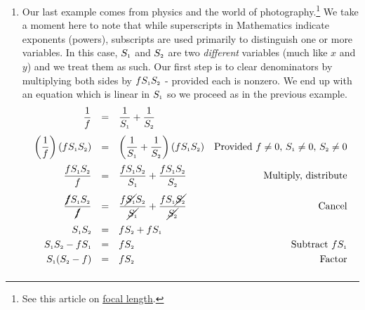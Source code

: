 \documentclass{ximera}
\begin{document}
\begin{example}
\begin{enumerate}
\item  Our last example comes from physics and the world of photography.\footnote{See this article on \href{https://en.wikipedia.org/wiki/Focal_length}{\underline{focal length}}.}  We take a moment here to note that while superscripts in Mathematics indicate exponents (powers), subscripts are used primarily to distinguish one or more variables.  In this case, $S_{\text{\tiny $1$}}$ and $S_{\text{\tiny $2$}}$ are two \textit{different} variables (much like $x$ and $y$) and we treat them as such. Our first step is to clear denominators by multiplying both sides by $f S_{\text{\tiny $1$}} S_{\text{\tiny $2$}}$ - provided each is nonzero.  We end up with an equation which is linear in $S_{\text{\tiny $1$}}$ so we proceed as in the previous example.  \[ \begin{array}{rclr}

\dfrac{1}{f} & = & \dfrac{1}{S_{\text{\tiny $1$}}} + \dfrac{1}{S_{\text{\tiny $2$}}} & \\ [12pt]


\left(\dfrac{1}{f}\right)(fS_{\text{\tiny $1$}}S_{\text{\tiny $2$}}) & = & \left(\dfrac{1}{S_{\text{\tiny $1$}}} + \dfrac{1}{S_{\text{\tiny $2$}}}\right) (fS_{\text{\tiny $1$}}S_{\text{\tiny $2$}}) & \text{Provided $f \neq 0$, $S_{\text{\tiny $1$}} \neq 0$, $S_{\text{\tiny $2$}}\neq 0$} \\ [12pt]

\dfrac{fS_{\text{\tiny $1$}}S_{\text{\tiny $2$}}}{f} & = & \dfrac{fS_{\text{\tiny $1$}}S_{\text{\tiny $2$}}}{S_{\text{\tiny $1$}}} + \dfrac{fS_{\text{\tiny $1$}}S_{\text{\tiny $2$}}}{S_{\text{\tiny $2$}}} & \text{Multiply, distribute} \\ [12pt]


\dfrac{\cancel{f}S_{\text{\tiny $1$}}S_{\text{\tiny $2$}}}{\cancel{f}} & = & \dfrac{f\cancel{S_{\text{\tiny $1$}}}S_{\text{\tiny $2$}}}{\cancel{S_{\text{\tiny $1$}}}} + \dfrac{fS_{\text{\tiny $1$}}\cancel{S_{\text{\tiny $2$}}}}{\cancel{S_{\text{\tiny $2$}}}} & \text{Cancel} \\ [12pt]

S_{\text{\tiny $1$}}S_{\text{\tiny $2$}} & = & f S_{\text{\tiny $2$}} + fS_{\text{\tiny $1$}} & \\ [3pt]

S_{\text{\tiny $1$}}S_{\text{\tiny $2$}}  - fS_{\text{\tiny $1$}} & = & f S_{\text{\tiny $2$}}   &  \text{Subtract $fS_{\text{\tiny $1$}}$} \\ [3pt]

S_{\text{\tiny $1$}}(S_{\text{\tiny $2$}} - f) & = & f S_{\text{\tiny $2$}} & \text{Factor}  \\ [5pt]


\end{array}\]
\end{enumerate}
\end{example}
\end{document}
